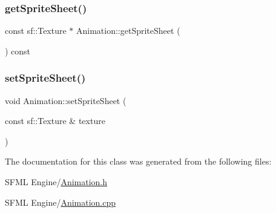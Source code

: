 \subsubsection{\texorpdfstring{get\+Sprite\+Sheet()}{getSpriteSheet()}}
{\footnotesize\ttfamily const sf\+::\+Texture $\ast$ Animation\+::get\+Sprite\+Sheet (\begin{DoxyParamCaption}{ }\end{DoxyParamCaption}) const}

\mbox{\label{class_animation_a2fb16f452a323d51a0104c0aa454cab3}} 
\subsubsection{\texorpdfstring{set\+Sprite\+Sheet()}{setSpriteSheet()}}
{\footnotesize\ttfamily void Animation\+::set\+Sprite\+Sheet (\begin{DoxyParamCaption}\item[{const sf\+::\+Texture \&}]{texture }\end{DoxyParamCaption})}



The documentation for this class was generated from the following files\+:\begin{DoxyCompactItemize}
\item 
S\+F\+M\+L Engine/\hyperlink{_animation_8h}{Animation.\+h}\item 
S\+F\+M\+L Engine/\hyperlink{_animation_8cpp}{Animation.\+cpp}\end{DoxyCompactItemize}
